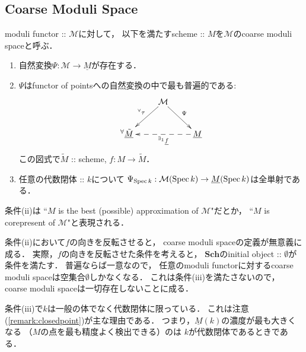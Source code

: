 \documentclass[a4paper]{jsarticle}
\newcommand{\Sch}{\mathbf{Sch}}
\newcommand{\ftor}[1]{\underline{#1}}
\newcommand{\ftorM}{\mathcal{M}}
\begin{document}
    \subsection{Coarse Moduli Space}
    \begin{Def}\label{def:coarse-moduli}
        moduli functor :: $\ftorM$に対して，
        以下を満たすscheme :: $M$を$\ftorM$のcoarse moduli spaceと呼ぶ．
        \begin{enumerate}[label=(\roman*), leftmargin=*]
            \item
                自然変換$\Psi: \ftorM \to \ftor{M}$が存在する．
            \item
                $\Psi$はfunctor of pointsへの自然変換の中で最も普遍的である:
                \[
                \xymatrix
                {
                    {} & \ar[ld]_-{{}^{\forall} \tau}\ftorM \ar[rd]^-{\Psi}& {} \\
                    {}^{\forall}\ftor{\tilde{M}} & {} & \ar@{-->}[ll]^-{{}^{\exists_1} \ftor{f}} \ftor{M}
                }
                \]
                この図式で$\tilde{M}$ :: scheme, $f: M \to \tilde{M}$．
            \item
                任意の代数閉体 :: $k$について
                $\Psi_{\Spec k}: \ftorM(\Spec k) \to \ftor{M}(\Spec k)$は全単射である．
        \end{enumerate}
    \end{Def}
    条件(ii)は
    ``$M$ is the best (possible) approximation of $\ftorM$"だとか，
    ``$M$ is corepresent of $\ftorM$"と表現される．

    \begin{Remark}
        条件(ii)において$f$の向きを反転させると，
        coarse moduli spaceの定義が無意義に成る．
        実際，$f$の向きを反転させた条件を考えると，
        $\Sch$のinitial object :: $\emptyset$が条件を満たす．
        普遍ならば一意なので，
        任意のmoduli functorに対するcoarse moduli spaceは空集合$\emptyset$しかなくなる．
        これは条件(iii)を満たさないので，
        coarse moduli spaceは一切存在しないことに成る．
    \end{Remark}

    \begin{Remark}
        条件(iii)で$k$は一般の体でなく代数閉体に限っている．
        これは注意(\ref{remark:closedpoint})が主な理由である．
        つまり，$\ftor{M}(k)$の濃度が最も大きくなる
        （$M$の点を最も精度よく検出できる）のは
        $k$が代数閉体であるときである．
    \end{Remark}
\end{document}
